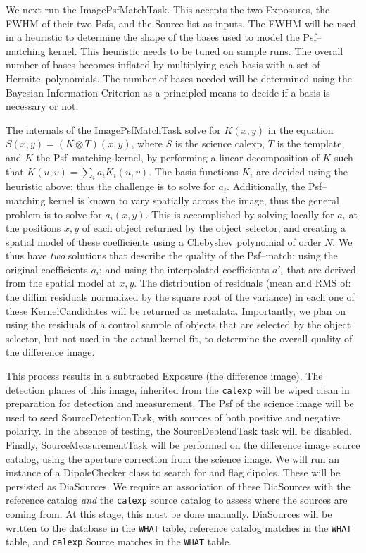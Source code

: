 \documentclass[12pt]{article}
\begin{document}
We next run the ImagePsfMatchTask.  This accepts the two Exposures,
the FWHM of their two Psfs, and the Source list as inputs.  The FWHM
will be used in a heuristic to determine the shape of the bases used
to model the Psf--matching kernel.  This heuristic needs to be tuned
on sample runs.  The overall number of bases becomes inflated by
multiplying each basis with a set of Hermite--polynomials.  The number
of bases needed will be determined using the Bayesian Information
Criterion as a principled means to decide if a basis is necessary or
not.

The internals of the ImagePsfMatchTask solve for $K(x,y)$ in the
equation $S(x,y) = (K \otimes T)(x,y)$, where $S$ is the science
calexp, $T$ is the template, and $K$ the Psf--matching kernel, by
performing a linear decomposition of $K$ such that $K(u,v) = \sum_i
a_i K_i(u,v)$.  The basis functions $K_i$ are decided using the
heuristic above; thus the challenge is to solve for $a_i$.
Additionally, the Psf--matching kernel is known to vary spatially
across the image, thus the general problem is to solve for $a_i(x,y)$.
This is accomplished by solving locally for $a_i$ at the positions
$x,y$ of each object returned by the object selector, and creating a
spatial model of these coefficients using a Chebyshev polynomial of
order $N$.  We thus have {\it two} solutions that describe the quality
of the Psf--match: using the original coefficients $a_i$; and using
the interpolated coefficients $a{'}_i$ that are derived from the
spatial model at $x,y$.  The distribution of residuals (mean and RMS
of: the diffim residuals normalized by the square root of the
variance) in each one of these KernelCandidates will be returned as
metadata.  Importantly, we plan on using the residuals of a control
sample of objects that are selected by the object selector, but not
used in the actual kernel fit, to determine the overall quality of the
difference image.

This process results in a subtracted Exposure (the difference image).
The detection planes of this image, inherited from the {\tt calexp}
will be wiped clean in preparation for detection and measurement.  The
Psf of the science image will be used to seed SourceDetectionTask,
with sources of both positive and negative polarity.  In the absence
of testing, the SourceDeblendTask task will be disabled.  Finally,
SourceMeasurementTask will be performed on the difference image
source catalog, using the aperture correction from the science image.  We
will run an instance of a DipoleChecker class to search for and flag
dipoles.  These will be persisted as DiaSources.  We require an
association of these DiaSources with the reference catalog {\it and}
the {\tt calexp} source catalog to assess where the sources are coming
from.  At this stage, this must be done manually.  DiaSources will be
written to the database in the {\tt WHAT} table, reference catalog
matches in the {\tt WHAT} table, and {\tt calexp} Source matches in
the {\tt WHAT} table.
\end{document}
